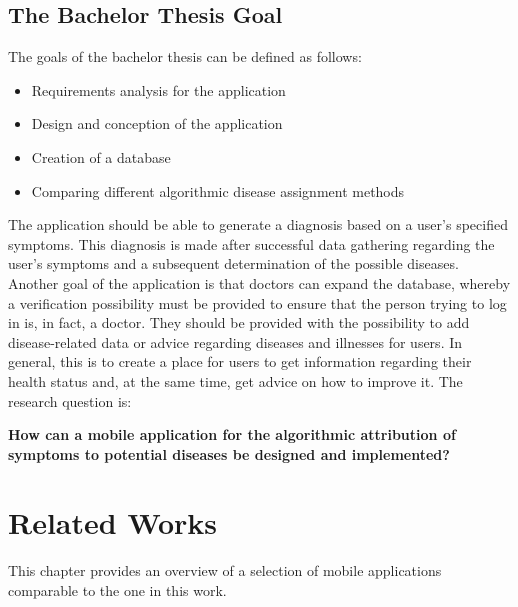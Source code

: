 \section{The Bachelor Thesis Goal}
The goals of the bachelor thesis can be defined as follows:
\begin{itemize}
	\item Requirements analysis for the application
	\item Design and conception of the application
	\item Creation of a database
	\item Comparing different algorithmic disease assignment methods
\end{itemize}
The application should be able to generate a diagnosis based on a user's specified symptoms. This diagnosis is made after successful data gathering regarding the user's symptoms and a subsequent determination of the possible diseases. Another goal of the application is that doctors can expand the database, whereby a verification possibility must be provided to ensure that the person trying to log in is, in fact, a doctor. They should be provided with the possibility to add disease-related data or advice regarding diseases and illnesses for users. In general, this is to create a place for users to get information regarding their health status and, at the same time, get advice on how to improve it. The research question is:
\newline \\
\begin{center}
	\textbf{How can a mobile application for the algorithmic attribution of symptoms to potential diseases be designed and implemented?}
\end{center}

\chapter{Related Works}
This chapter provides an overview of a selection of mobile applications comparable to the one in this work.


